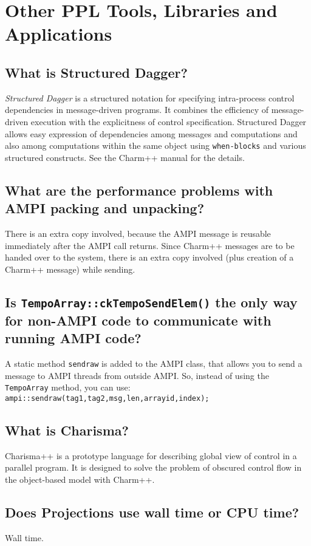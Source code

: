 \section{Other PPL Tools, Libraries and Applications}

\subsection{What is Structured Dagger?}

{\em Structured Dagger} is a structured notation for specifying intra-process
control dependencies in message-driven programs. It combines the efficiency
of message-driven execution with the explicitness of control specification.
Structured Dagger allows easy expression of dependencies among messages
and computations and also among computations within the same object using
{\tt when-blocks}
and various structured constructs. See the Charm++ manual for the details.

\subsection{What are the performance problems with AMPI packing and unpacking?}

There is an extra copy involved, because the AMPI message is reusable
immediately after the AMPI call returns. Since Charm++ messages are to
be handed over to the system, there is an extra copy involved (plus creation
of a Charm++ message) while sending.



\subsection{Is {\tt TempoArray::ckTempoSendElem()} the only way for non-AMPI
code to communicate with running AMPI code?}

A static method {\tt sendraw} is added to the AMPI class, that allows
you to send a message to AMPI threads from outside AMPI. So, instead of
using the {\tt TempoArray} method, you can use:
{\tt ampi::sendraw(tag1,tag2,msg,len,arrayid,index);}

\subsection{What is Charisma?}

Charisma++ is a prototype language for describing global view of control in a parallel program. It is designed to solve the problem of obscured control flow in the object-based model with Charm++.

\subsection{Does Projections use wall time or CPU time?}

Wall time.
